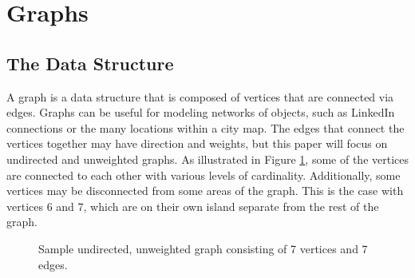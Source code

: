 \documentclass[letterpaper, 10pt,DIV=13]{scrartcl}
\numberwithin{equation}{section} %
\numberwithin{figure}{section} %
\numberwithin{table}{section} %
\begin{document}
\section{Graphs}
\subsection{The Data Structure}
A graph is a data structure that is composed of vertices that are connected via edges. Graphs can be useful for modeling networks of objects, such as LinkedIn connections or the many locations within a city map. The edges that connect the vertices together may have direction and weights, but this paper will focus on undirected and unweighted graphs. As illustrated in Figure \ref{figure:graph}, some of the vertices are connected to each other with various levels of cardinality. Additionally, some vertices may be disconnected from some areas of the graph. This is the case with vertices 6 and 7, which are on their own island separate from the rest of the graph.

\begin{figure}
  \hspace*{\fill}
  \hspace*{\fill}
  \caption{Sample undirected, unweighted graph consisting of 7 vertices and 7 edges.}
  \label{figure:graph}
\end{figure}

\end{document}
